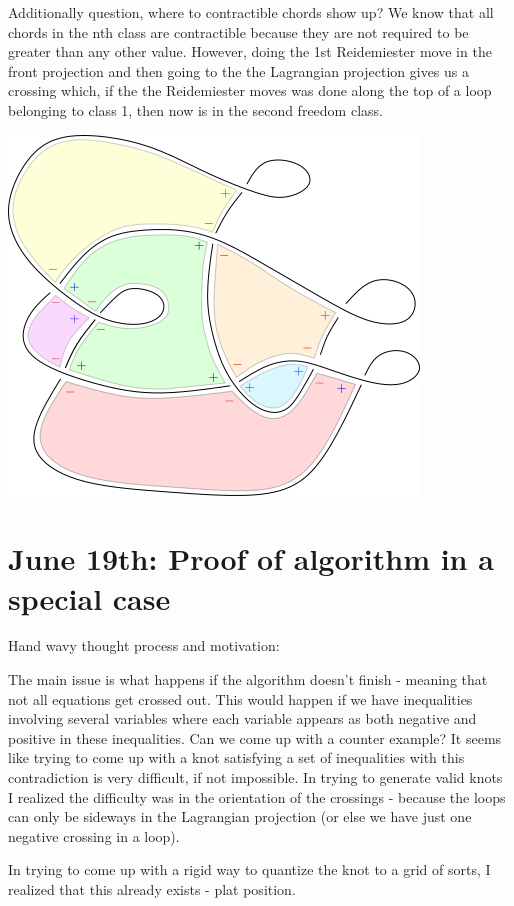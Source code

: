 \documentclass[11pt]{amsart}
\begin{document}
Additionally question, where to contractible chords show up? We know that all chords in the nth class are contractible because they are not required to be greater than any other value. However, doing the 1st Reidemiester move in the front projection and then going to the the Lagrangian projection gives us a crossing which, if the the Reidemiester moves was done along the top of a loop belonging to class 1, then now is in the second freedom class. 


\includegraphics[]{General Information/path184.png}



\section{June 19th: Proof of algorithm in a special case}

Hand wavy thought process and motivation: 

The main issue is what happens if the algorithm doesn't finish - meaning that not all equations get crossed out. This would happen if we have inequalities involving several variables where each variable appears as both negative and positive in these inequalities. Can we come up with a counter example? It seems like trying to come up with a knot satisfying a set of inequalities with this contradiction is very difficult, if not impossible. In trying to generate valid knots I realized the difficulty was in the orientation of the crossings - because the loops can only be sideways in the Lagrangian projection (or else we have just one negative crossing in a loop). 

In trying to come up with a rigid way to quantize the knot to a grid of sorts, I realized that this already exists - plat position.
\end{document}
